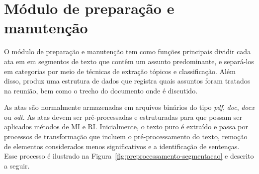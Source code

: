 \section{Módulo de preparação e manutenção}

O módulo de preparação e manutenção tem como funções principais dividir cada ata em em segmentos de texto que contêm um assunto predominante, e separá-los em categorias por meio de técnicas de extração tópicos e classificação. Além disso, produz uma estrutura de dados que registra quais assuntos foram tratados na reunião, bem como o trecho do documento onde é discutido.  






As atas são normalmente armazenadas em arquivos binários do tipo \textit{pdf}, \textit{doc}, \textit{docx} ou \textit{odt}. As atas devem ser pré-processadas e estruturadas para que possam ser aplicados métodos de MI e RI. Inicialmente, o texto puro é extraído e passa por processos de transformação que incluem o pré-processamento do texto, remoção de elementos considerados menos significativos e a identificação de sentenças. Esse processo é ilustrado na Figura~\ref{fig:preprocessamento-segmentacao} e descrito a seguir.

	

